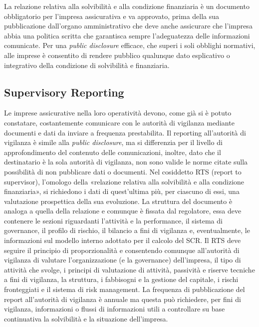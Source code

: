La relazione relativa alla solvibilità e alla condizione finanziaria è un documento obbligatorio per l’impresa assicurativa e va approvato, prima della sua pubblicazione dall’organo amministrativo che deve anche assicurare che l’impresa abbia una politica scritta che garantisca sempre l’adeguatezza delle informazioni comunicate. Per una {\itshape public disclosure} efficace, che superi i soli obblighi normativi, alle imprese è consentito di rendere pubblico qualunque dato esplicativo o integrativo della condizione di solvibilità e finanziaria.

\subsection{Supervisory Reporting}
Le imprese assicurative nella loro operatività devono, come già si è potuto constatare, costantemente comunicare con le autorità di vigilanza mediante documenti e dati da inviare a frequenza prestabilita. Il reporting all’autorità di vigilanza è simile alla {\itshape public disclosure}, ma si differenzia per il livello di approfondimento del contenuto delle comunicazioni, inoltre, dato che il destinatario è la sola autorità di vigilanza, non sono valide le norme citate sulla possibilità di non pubblicare dati o documenti.
Nel cosiddetto RTS (report to supervisor), l’omologo della «relazione relativa alla solvibilità e alla condizione finanziaria», si richiedono i dati di quest’ultima più, per ciascuno di essi, una valutazione prospettica della sua evoluzione.
La struttura del documento è analoga a quella della relazione e comunque è fissata dal regolatore, essa deve contenere le sezioni riguardanti l’attività e la performance, il sistema di governance, il profilo di rischio, il bilancio a fini di vigilanza e, eventualmente, le informazioni sul modello interno adottato per il calcolo del SCR.
Il RTS deve seguire il principio di proporzionalità e consentendo comunque all’autorità di vigilanza di valutare l’organizzazione (e la governance) dell’impresa, il tipo di attività che svolge, i principi di valutazione di attività, passività e riserve tecniche a fini di vigilanza, la struttura, i fabbisogni e la gestione del capitale, i rischi fronteggiati e il sistema di risk management.
La frequenza di pubblicazione del report all’autorità di vigilanza è annuale ma questa può richiedere, per fini di vigilanza, informazioni o flussi di informazioni utili a controllare su base continuativa la solvibilità e la situazione dell’impresa.
